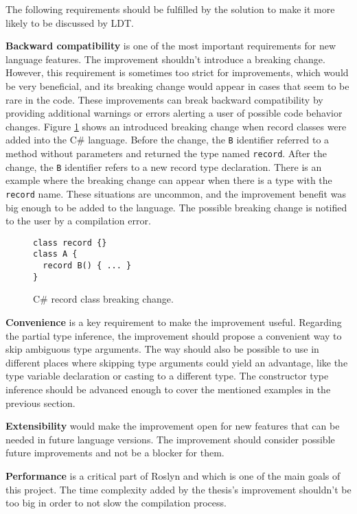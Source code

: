 The following requirements should be fulfilled by the solution to make it more likely to be discussed by LDT.
\par
\textbf{Backward compatibility} is one of the most important requirements for new language features. 
The improvement shouldn’t introduce a breaking change. However, this requirement is sometimes too strict for improvements, which would be very beneficial, and its breaking change would appear in cases that seem to be rare in the code. 
These improvements can break backward compatibility by providing additional warnings or errors alerting a user of possible code behavior changes.
Figure \ref{img39:brkCh} shows an introduced breaking change when record classes were added into the C\# language. 
Before the change, the \texttt{B} identifier referred to a method without parameters and returned the type named \texttt{record}. 
After the change, the \texttt{B} identifier refers to a new record type declaration. 
There is an example where the breaking change can appear when there is a type with the \texttt{record} name. 
These situations are uncommon, and the improvement benefit was big enough to be added to the language. 
The possible breaking change is notified to the user by a compilation error.
\begin{figure}[h]
\begin{lstlisting}[style=csharp]
class record {}
class A {
  record B() { ... }
}
\end{lstlisting}
\caption{C\# record class breaking change.}
\label{img39:brkCh}
\end{figure}
\par
\textbf{Convenience} is a key requirement to make the improvement useful. 
Regarding the partial type inference, the improvement should propose a convenient way to skip ambiguous type arguments. 
The way should also be possible to use in different places where skipping type arguments could yield an advantage, like the type variable declaration or casting to a different type. 
The constructor type inference should be advanced enough to cover the mentioned examples in the previous section.
\par
\textbf{Extensibility} would make the improvement open for new features that can be needed in future language versions. 
The improvement should consider possible future improvements and not be a blocker for them.
\par
\textbf{Performance} is a critical part of Roslyn and which is one of the main goals of this project.
The time complexity added by the thesis’s improvement shouldn’t be too big in order to not slow the compilation process.

